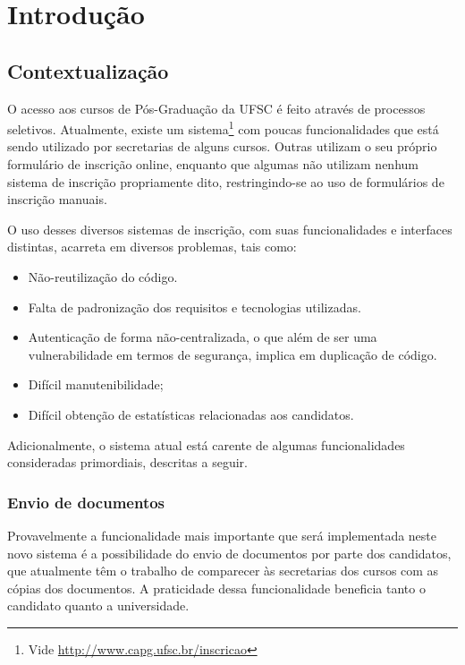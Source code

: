 \documentclass[
  10.5pt,				  %
	openright,			%
	twoside,			  %
  a5paper,
  chapter=TITLE,	%
	section=TITLE,	%
  hyphens,        %
	english,        %
	brazil          %
]{abntex2}
\begin{document}
\chapter{Introdução}

\section{Contextualização}

O acesso aos cursos de Pós-Graduação da UFSC é feito através de processos seletivos. Atualmente, existe um sistema\footnote{Vide \href{}{http://www.capg.ufsc.br/inscricao}} com poucas funcionalidades que está sendo utilizado por secretarias de alguns cursos. Outras utilizam o seu próprio formulário de inscrição online, enquanto que algumas não utilizam nenhum sistema de inscrição propriamente dito, restringindo-se ao uso de formulários de inscrição manuais.

O uso desses diversos sistemas de inscrição, com suas funcionalidades e interfaces distintas, acarreta em diversos problemas, tais como:

\begin{itemize}
  \item Não-reutilização do código.
  \item Falta de padronização dos requisitos e tecnologias utilizadas.
  \item Autenticação de forma não-centralizada, o que além de ser uma vulnerabilidade em termos de segurança, implica em duplicação de código.
  \item Difícil manutenibilidade;
  \item Difícil obtenção de estatísticas relacionadas aos candidatos.
\end{itemize}

Adicionalmente, o sistema atual está carente de algumas funcionalidades consideradas primordiais, descritas a seguir.

\subsection{Envio de documentos}
Provavelmente a funcionalidade mais importante que será implementada neste novo sistema é a possibilidade do envio de documentos por parte dos candidatos, que atualmente têm o trabalho de comparecer às secretarias dos cursos com as cópias dos documentos. A praticidade dessa funcionalidade beneficia tanto o candidato quanto a universidade.
\end{document}
